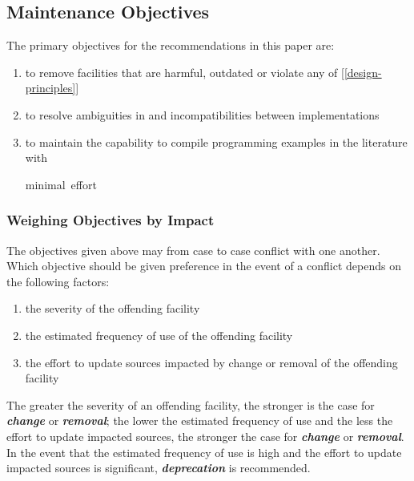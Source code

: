 \documentclass[10pt,a4paper]{article}
\renewcommand{\emph}[1]{\textbf{\textit{#1}}}
\begin{document}
\subsection{Maintenance Objectives}

The primary objectives for the recommendations in this paper are:

\renewcommand{\labelenumi}{(\arabic{enumi})}
\begin{enumerate}[leftmargin=!, labelindent=-0.75em, itemindent=0em]
\item to remove facilities that are harmful, outdated or violate
any of [\ref{design-principles}]
\item to resolve ambiguities in \cite{Wirth88} and incompatibilities between
implementations
\item to maintain the capability to compile programming examples in the
literature with \raggedright{minimal~effort}
\end{enumerate}

\subsubsection{Weighing Objectives by Impact}

\noindent The objectives given above may from case to case conflict with one
another. Which objective should be given preference in the event of a conflict
depends on the following factors:

\begin{enumerate}[itemindent=-0.75em]
\item the severity of the \gls{offending facility}
\item the estimated frequency of use of the \gls{offending facility}
\item the effort to update sources impacted by change or removal of the
\gls{offending facility}
\end{enumerate}

\noindent The greater the severity of an \gls{offending facility}, the stronger
is the case for \emph{change} or \emph{removal}; the lower the estimated
frequency of use and the less the effort to update impacted sources, the
stronger the case for \emph{change} or \emph{removal}. In the event that
the estimated frequency of use is high and the effort to update impacted
sources is significant, \emph{deprecation} is recommended.
\end{document}
